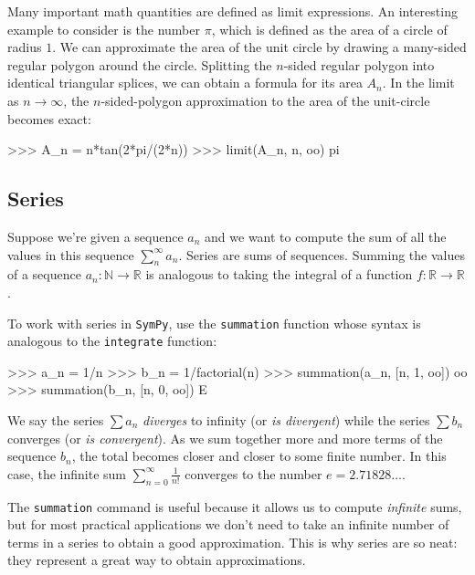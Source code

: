 \medskip

Many important math quantities are defined as limit expressions.
An interesting example to consider is the number $\pi$, 
which is defined as the area of a circle of radius $1$.
We can approximate the area of the unit circle by drawing a many-sided regular polygon around the circle.
Splitting the $n$-sided regular polygon into identical triangular splices,
we can obtain a formula for its area $A_n$.
In the limit as $n\to \infty$, 
the $n$-sided-polygon approximation to the area of the unit-circle becomes exact:



\small
\begin{verbatimtab}
>>> A_n = n*tan(2*pi/(2*n))
>>> limit(A_n, n, oo)
pi
\end{verbatimtab}
\normalsize
\subsection{Series}
\label{calculus:series}

Suppose we're given a sequence $a_n$ and we want to compute the sum of all the values in this sequence $\sum_{n}^\infty a_n$.
Series are sums of sequences.
Summing the values of a sequence $a_n:\mathbb{N}\to \mathbb{R}$
is analogous to taking the integral of a function $f:\mathbb{R}\to \mathbb{R}$.

To work with series in \texttt{SymPy},
use the \texttt{summation} function whose syntax is analogous to the \texttt{integrate} function: 

\small
\begin{verbatimtab}
>>> a_n = 1/n
>>> b_n = 1/factorial(n)
>>> summation(a_n, [n, 1, oo])
oo
>>> summation(b_n, [n, 0, oo])
E
\end{verbatimtab}
\normalsize

\noindent
We say the series $\sum a_n$ \emph{diverges} to infinity (or \emph{is divergent}) while the series $\sum b_n$ converges (or \emph{is convergent}).
As we sum together more and more terms of the sequence $b_n$, the total becomes closer and closer to some finite number.
In this case, the infinite sum $\sum_{n=0}^\infty \frac{1}{n!}$ converges to the number $e=2.71828\ldots$.


The \texttt{summation} command is useful because it allows us to compute \emph{infinite} sums,
but for most practical applications we don't need to take an infinite number of terms in a series to obtain a good approximation. 
This is why series are so neat: they represent a great way to obtain approximations.

